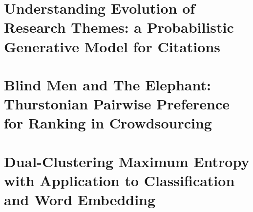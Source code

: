 \documentclass[edeposit,fullpage]{uiucthesis2009}
\theoremstyle{plain}
\theoremstyle{definition}
\theoremstyle{remark}
\newcommand{\DCME}{Dual-Clustering Maximum Entropy}
\begin{document}
\tableofcontents
\listoftables
\listoffigures





\mainmatter




\chapter{Understanding Evolution of Research Themes:  a Probabilistic Generative
Model for Citations}


\chapter{Blind Men and The Elephant: Thurstonian Pairwise Preference for Ranking
in Crowdsourcing}







\chapter{\DCME{} \\ with Application to Classification and Word Embedding}





\end{document}
